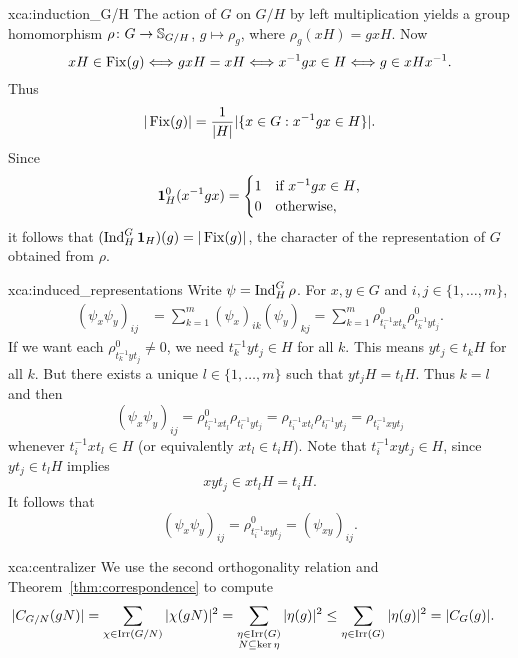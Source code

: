 \begin{sol}{xca:induction_G/H}
    The action of $G$ on $G/H$ by left multiplication
    yields a group homomorphism 
    $\rho\colon G\to\mathbb{S}_{G/H}$, $g\mapsto\rho_g$, where
    $\rho_g(xH)=gxH$. Now
    \[
    xH\in\operatorname{Fix}(g)\Longleftrightarrow
    gxH=xH\Longleftrightarrow
    x^{-1}gx\in H\Longleftrightarrow
    g\in xHx^{-1}.
    \]
    Thus 
    \[
    |\operatorname{Fix}(g)|=\frac{1}{|H|}|\{x\in G:x^{-1}gx\in H\}|.
    \]
    Since
    \[
    \mathbf{1}_H^0(x^{-1}gx)=\begin{cases}
        1 & \text{if $x^{-1}gx\in H$,}\\
        0 & \text{otherwise},
    \end{cases}
    \]
    it follows that 
    $(\operatorname{Ind}_H^G\mathbf{1}_H)(g)=|\operatorname{Fix}(g)|$, the character
    of the representation of $G$ obtained from $\rho$. 
\end{sol}

\begin{sol}{xca:induced_representations}
Write $\psi=\operatorname{Ind}_H^G\rho$. For $x,y\in G$ and 
$i,j\in\{1,\dots,m\}$, 
\begin{align*}
    (\psi_x\psi_y)_{ij} &= \sum_{k=1}^m 
    (\psi_x)_{ik}(\psi_y)_{kj}
    =\sum_{k=1}^m\rho_{t_i^{-1}xt_k}^0\rho_{t_k^{-1}yt_j}^0.
\end{align*}
If we want each $\rho_{t_k^{-1}yt_j}^0\ne0$, we need
$t_k^{-1}yt_j\in H$ for all $k$. This means $yt_j\in t_kH$ for all $k$. But there exists a unique $l\in\{1,\dots,m\}$ such that 
$yt_jH=t_lH$. Thus $k=l$ and then 
\[
(\psi_x\psi_y)_{ij} = \rho_{t_i^{-1}xt_l}^0\rho_{t_l^{-1}yt_j}=\rho_{t_i^{-1}xt_l}\rho_{t_l^{-1}yt_j}=\rho_{t_i^{-1}xyt_j}
\]
whenever $t_i^{-1}xt_l\in H$ (or equivalently 
$xt_l\in t_iH$). Note that 
$t_i^{-1}xyt_j\in H$, since 
$yt_j\in t_lH$ implies 
\[
xyt_j\in xt_lH=t_iH.
\]
It follows that 
\[
(\psi_x\psi_y)_{ij}=\rho_{t_i^{-1}xyt_j}^0=(\psi_{xy})_{ij}.
\]
\end{sol}


\begin{sol}{xca:centralizer}
    We use the second orthogonality relation and Theorem~\ref{thm:correspondence} 
    to compute
    \begin{align*}
        |C_{G/N}(gN)| &=\sum_{\chi\in\operatorname{Irr}(G/N)}|\chi(gN)|^2
        =\sum_{\substack{\eta\in\operatorname{Irr}(G)\\N\subseteq\ker\eta}} |\eta(g)|^2
        \leq\sum_{\eta\in\operatorname{Irr}(G)}|\eta(g)|^2=|C_G(g)|.
    \end{align*}
\end{sol}


